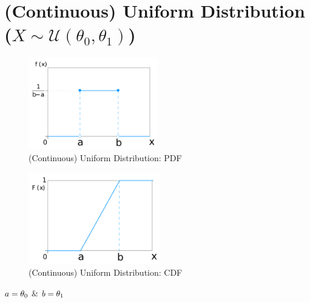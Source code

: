 \chapter{(Continuous) Uniform Distribution ($X \sim \mathcal{U}(\theta_0,\theta_1)$) \cite{ism-1,wiki/Continuous_uniform_distribution}} \label{Uniform Distribution}

\begin{table}[H]
    \begin{minipage}{0.49\linewidth}
        \begin{figure}[H]
            \centering
            \includegraphics[width=\linewidth, height=4cm, keepaspectratio]{Pictures/distributions/Uniform_Distribution_PDF.jpg}
            \caption{(Continuous) Uniform Distribution: PDF}
        \end{figure}
    \end{minipage}
    \hfill
    \begin{minipage}{0.49\linewidth}
        \begin{figure}[H]
            \centering
            \includegraphics[width=\linewidth, height=4cm, keepaspectratio]{Pictures/distributions/Uniform_Distribution_CDF.jpg}
            \caption{(Continuous) Uniform Distribution: CDF}
        \end{figure}
    \end{minipage}
\end{table}

$\hfill a = \theta_0$ \hfill \& \hfill $b = \theta_1 \hfill$

